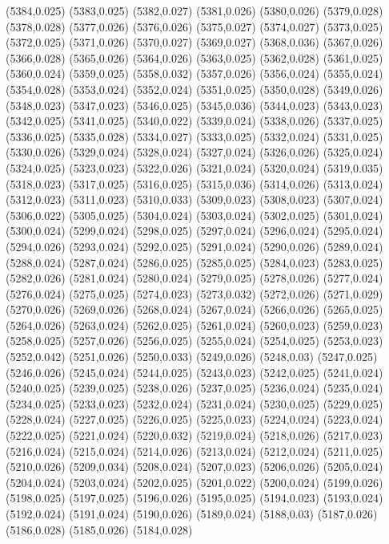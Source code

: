 (5384,0.025)
(5383,0.025)
(5382,0.027)
(5381,0.026)
(5380,0.026)
(5379,0.028)
(5378,0.028)
(5377,0.026)
(5376,0.026)
(5375,0.027)
(5374,0.027)
(5373,0.025)
(5372,0.025)
(5371,0.026)
(5370,0.027)
(5369,0.027)
(5368,0.036)
(5367,0.026)
(5366,0.028)
(5365,0.026)
(5364,0.026)
(5363,0.025)
(5362,0.028)
(5361,0.025)
(5360,0.024)
(5359,0.025)
(5358,0.032)
(5357,0.026)
(5356,0.024)
(5355,0.024)
(5354,0.028)
(5353,0.024)
(5352,0.024)
(5351,0.025)
(5350,0.028)
(5349,0.026)
(5348,0.023)
(5347,0.023)
(5346,0.025)
(5345,0.036)
(5344,0.023)
(5343,0.023)
(5342,0.025)
(5341,0.025)
(5340,0.022)
(5339,0.024)
(5338,0.026)
(5337,0.025)
(5336,0.025)
(5335,0.028)
(5334,0.027)
(5333,0.025)
(5332,0.024)
(5331,0.025)
(5330,0.026)
(5329,0.024)
(5328,0.024)
(5327,0.024)
(5326,0.026)
(5325,0.024)
(5324,0.025)
(5323,0.023)
(5322,0.026)
(5321,0.024)
(5320,0.024)
(5319,0.035)
(5318,0.023)
(5317,0.025)
(5316,0.025)
(5315,0.036)
(5314,0.026)
(5313,0.024)
(5312,0.023)
(5311,0.023)
(5310,0.033)
(5309,0.023)
(5308,0.023)
(5307,0.024)
(5306,0.022)
(5305,0.025)
(5304,0.024)
(5303,0.024)
(5302,0.025)
(5301,0.024)
(5300,0.024)
(5299,0.024)
(5298,0.025)
(5297,0.024)
(5296,0.024)
(5295,0.024)
(5294,0.026)
(5293,0.024)
(5292,0.025)
(5291,0.024)
(5290,0.026)
(5289,0.024)
(5288,0.024)
(5287,0.024)
(5286,0.025)
(5285,0.025)
(5284,0.023)
(5283,0.025)
(5282,0.026)
(5281,0.024)
(5280,0.024)
(5279,0.025)
(5278,0.026)
(5277,0.024)
(5276,0.024)
(5275,0.025)
(5274,0.023)
(5273,0.032)
(5272,0.026)
(5271,0.029)
(5270,0.026)
(5269,0.026)
(5268,0.024)
(5267,0.024)
(5266,0.026)
(5265,0.025)
(5264,0.026)
(5263,0.024)
(5262,0.025)
(5261,0.024)
(5260,0.023)
(5259,0.023)
(5258,0.025)
(5257,0.026)
(5256,0.025)
(5255,0.024)
(5254,0.025)
(5253,0.023)
(5252,0.042)
(5251,0.026)
(5250,0.033)
(5249,0.026)
(5248,0.03)
(5247,0.025)
(5246,0.026)
(5245,0.024)
(5244,0.025)
(5243,0.023)
(5242,0.025)
(5241,0.024)
(5240,0.025)
(5239,0.025)
(5238,0.026)
(5237,0.025)
(5236,0.024)
(5235,0.024)
(5234,0.025)
(5233,0.023)
(5232,0.024)
(5231,0.024)
(5230,0.025)
(5229,0.025)
(5228,0.024)
(5227,0.025)
(5226,0.025)
(5225,0.023)
(5224,0.024)
(5223,0.024)
(5222,0.025)
(5221,0.024)
(5220,0.032)
(5219,0.024)
(5218,0.026)
(5217,0.023)
(5216,0.024)
(5215,0.024)
(5214,0.026)
(5213,0.024)
(5212,0.024)
(5211,0.025)
(5210,0.026)
(5209,0.034)
(5208,0.024)
(5207,0.023)
(5206,0.026)
(5205,0.024)
(5204,0.024)
(5203,0.024)
(5202,0.025)
(5201,0.022)
(5200,0.024)
(5199,0.026)
(5198,0.025)
(5197,0.025)
(5196,0.026)
(5195,0.025)
(5194,0.023)
(5193,0.024)
(5192,0.024)
(5191,0.024)
(5190,0.026)
(5189,0.024)
(5188,0.03)
(5187,0.026)
(5186,0.028)
(5185,0.026)
(5184,0.028)
